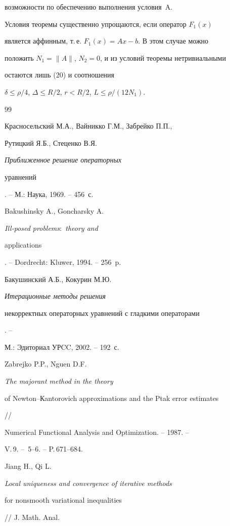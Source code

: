 возможности по обеспечению выполнения условия~A.





Условия теоремы существенно упрощаются, если оператор $F_1(x)$ 


является аффинным, т.\,е. $F_1(x)=Ax-b$. В этом случае можно 


положить $N_1=\|A\|$, $N_2=0$, и из условий теоремы нетривиальными 


остаются лишь (20) и соотношения


$\delta\le\rho/4$, $\Delta\le R/2$, $r<R/2$, $L\le\rho/(12N_1)$.








\begin{thebibliography}{99}







Красносельский М.А., Вайникко Г.М., Забрейко П.П., 


Рутицкий Я.Б., Стеценко В.Я. {\em Приближенное решение операторных 


уравнений}. -- М.: Наука, 1969. -- 456~с.




Bakushinsky A., Goncharsky A. {\em Ill-posed problems$:$ theory and 


applications}. -- Dordrecht: Kluwer, 1994. -- 256~p.




Бакушинский А.Б., Кокурин М.Ю. {\em Итерационные методы решения 


некорректных операторных уравнений с гладкими операторами}. --


М.: Эдиториал УРCC, 2002. -- 192~с.




Zabrejko P.P., Nguen D.F. {\em The majorant method in the theory 


of Newton--Кantorovich approximations and the Ptak error estimates} // 


Numerical Functional Analysis and Optimization. -- 1987. --


V.\,9. -- \No\,5--6. -- P.\,671--684.




Jiang H., Qi L. {\em Local uniqueness and convergence of iterative methods 


for nonsmooth variational inequalities} // J. Math. Anal.



\end{thebibliography}
